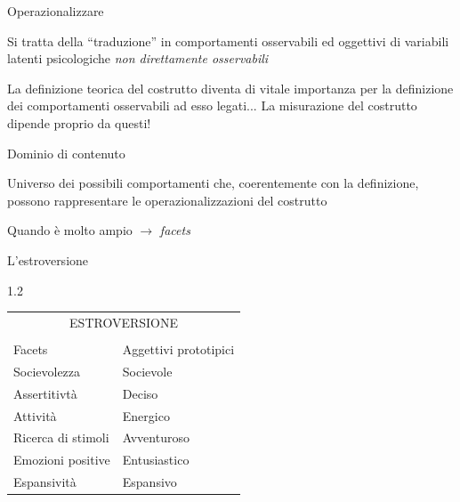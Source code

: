 \documentclass[compress]{beamer}
\newcommand\Factor{1.2}
\begin{document}
\begin{frame}{Operazionalizzare}
	
	Si tratta della ``traduzione'' in comportamenti osservabili ed oggettivi di variabili latenti psicologiche \emph{non direttamente osservabili}
	
	La definizione teorica del costrutto diventa di vitale importanza per la definizione dei comportamenti osservabili ad esso legati... La misurazione del costrutto dipende proprio da questi!
	
	\begin{block}{Dominio di contenuto}
		
		Universo dei possibili comportamenti che, coerentemente con la definizione, possono rappresentare le operazionalizzazioni del costrutto 
		
		Quando è molto ampio $\rightarrow$ \emph{facets}
		
	\end{block}
\end{frame}

\begin{frame}{L'estroversione}
	\begin{spacing}\Factor
		\begin{table}
		\begin{tabular}{l l}
		\multicolumn{2}{c}{ESTROVERSIONE}\\
&  \\
		\hline
		Facets	&	Aggettivi prototipici	\\\hline
		Socievolezza	&	Socievole	\\
		Assertitivtà	&	Deciso	\\
		Attività	&	Energico	\\
		Ricerca di stimoli 	&	Avventuroso	\\
		Emozioni positive	&	Entusiastico	\\
		Espansività	&	Espansivo	\\\hline
		
	\end{tabular}
		\end{table}

	\end{spacing}

\end{frame}
\end{document}
